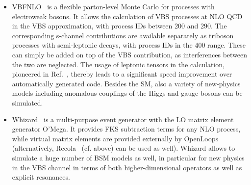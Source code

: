 \begin{itemize}
  \item {\sc VBFNLO}~\cite{Arnold:2008rz, Arnold:2011wj, Baglio:2014uba} is a flexible
    parton-level Monte Carlo for processes with electroweak bosons. It
    allows the calculation of VBS processes at NLO QCD in the VBS
    approximation, with process IDs between 200 and 290. The corresponding
    s-channel contributions are available separately as triboson processes with
    semi-leptonic decays, with process IDs in the 400 range. These can simply
    be added on top of the VBS contribution, as interferences between the two are neglected.
    The usage of leptonic tensors in the calculation, pioneered in
    Ref.~\cite{Jager:2006zc}, thereby leads to a significant speed improvement over
    automatically generated code.  Besides the SM, also a variety of
    new-physics models including anomalous couplings of the Higgs and gauge
    bosons can be simulated.

  \item {\sc Whizard}~\cite{Moretti:2001zz,Kilian:2007gr} is a multi-purpose
event generator with the LO matrix element generator {\sc O'Mega}. It
provides FKS subtraction terms for any NLO process, while virtual matrix
elements are provided externally by {\sc
OpenLoops}~\cite{Cascioli:2011va} (alternatively, {\sc Recola}~\cite{Actis:2012qn,Actis:2016mpe}
(cf. above) can be used as well). {\sc Whizard} allows to simulate a
huge number of BSM models as well, in particular for new physics in
the VBS channel in terms of both higher-dimensional operators as well as explicit
resonances.

\end{itemize}
